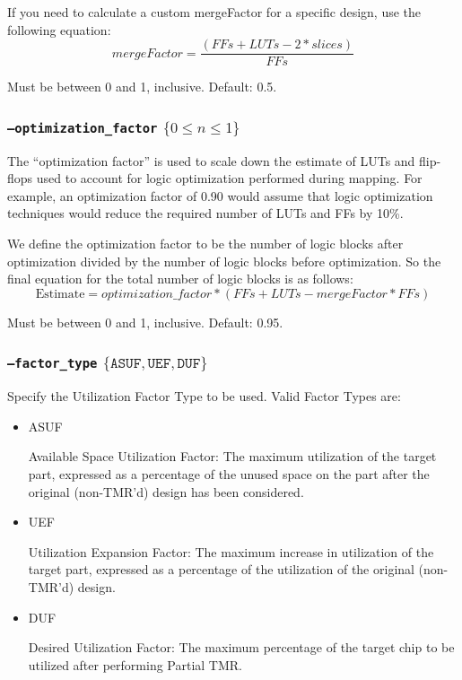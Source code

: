 If you need to calculate a custom mergeFactor for a specific design, use the 
following equation:
\begin{equation*}
mergeFactor = \frac{(FFs + LUTs - 2 * slices)}{FFs}
\end{equation*}

Must be between 0 and 1, inclusive. Default: 0.5.

\subsubsection{\texttt{--optimization\_factor} $\{ 0 \leq n \leq 1 \}$}
The ``optimization factor'' is used to scale down the estimate of LUTs and 
flip-flops used to account for logic optimization performed during mapping. For 
example, an optimization factor of 0.90 would assume that logic optimization 
techniques would reduce the required number of LUTs and FFs by 10\%.

We define the optimization factor to be the number of logic blocks after 
optimization divided by the number of logic blocks before optimization.  So the 
final equation for the total number of logic blocks is as follows:
\begin{equation*}
\mathrm{Estimate} = optimization\_factor * (FFs + LUTs -  mergeFactor * FFs)
\end{equation*}

Must be between 0 and 1, inclusive. Default: 0.95.

\subsubsection{\texttt{--factor\_type} $\{ \mathtt{ASUF},\mathtt{UEF},\mathtt{DUF} \}$ }
Specify the Utilization Factor Type to be used. Valid Factor Types are:

\begin{itemize}
\item ASUF 

Available Space Utilization Factor: The maximum utilization of the target part,
expressed as a percentage of the unused space on the part after the original
(non-TMR'd) design has been considered.

\item UEF 

Utilization Expansion Factor: The maximum increase in utilization of the target
part, expressed as a percentage of the utilization of the original (non-TMR'd)
design.

\item DUF 

Desired Utilization Factor: The maximum percentage of the target chip to be
utilized after performing Partial TMR.
\end{itemize}

